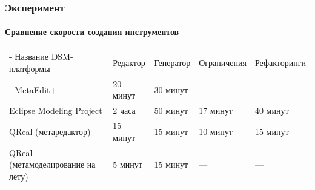 \documentclass[14pt]{beamer}
\begin{document}
\begin{frame}
    \frametitle{Эксперимент}
    \framesubtitle{Сравнение скорости создания инструментов}
    \begin{table}[ht]
        \footnotesize
        \tabulinesep=0.9mm
    	\begin{tabu} {| X[1 l p] | X[1 l p] | X[1 l p] | X[1 l p] |X[1.1 l p] |}
    		\tabucline-
    		 Название DSM-платформы           & Редактор  & Генератор  & Ограничения  & Рефакторинги  \\
    		\tabucline-
    		\everyrow{\tabucline-}
    		MetaEdit+                         & 20 минут  & 30 минут   & ---          & ---           \\
    		Eclipse Modeling Project          & 2 часа    & 50 минут   & 17 минут     & 40 минут      \\
    		QReal (метаредактор)              & 15 минут  & 15 минут   & 10 минут     & 15 минут      \\
    		QReal (метамоделирование на лету) & 5 минут   & 15 минут   & ---          & ---
    		\label{tab:experiment}
    	\end{tabu}
    \end{table}
\end{frame}
\end{document}
